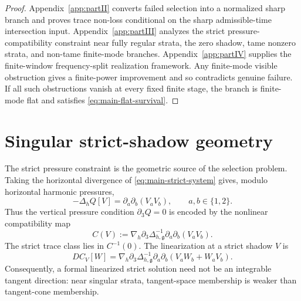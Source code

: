 \documentclass[11pt]{article}
\numberwithin{equation}{section}
\theoremstyle{plain}
\theoremstyle{definition}
\theoremstyle{remark}
\begin{document}
\begin{proof}
Appendix~\ref{app:partII} converts failed selection into a normalized sharp branch and proves trace non-loss conditional on the sharp admissible-time intersection input.  Appendix~\ref{app:partIII} analyzes the strict pressure-compatibility constraint near fully regular strata, the zero shadow, tame nonzero strata, and non-tame finite-mode branches.  Appendix~\ref{app:partIV} supplies the finite-window frequency-split realization framework.  Any finite-mode visible obstruction gives a finite-power improvement and so contradicts genuine failure.  If all such obstructions vanish at every fixed finite stage, the branch is finite-mode flat and satisfies \eqref{eq:main-flat-survival}.
\end{proof}

\section{Singular strict-shadow geometry}\label{sec:main-geometry}

The strict pressure constraint is the geometric source of the selection problem.  Taking the horizontal divergence of \eqref{eq:main-strict-system} gives, modulo horizontal harmonic pressures,
\[
        -\Delta_h Q[V]=\partial_a\partial_b(V_aV_b),
        \qquad a,b\in\{1,2\}.
\]
Thus the vertical pressure condition \(\partial_3Q=0\) is encoded by the nonlinear compatibility map
\begin{equation}\label{eq:main-compatibility-map}
        C(V):=\nabla_h\partial_3\Delta_{h,\mathfrak g}^{-1}\partial_a\partial_b(V_aV_b).
\end{equation}
The strict trace class lies in \(C^{-1}(0)\).  The linearization at a strict shadow \(V\) is
\[
        DC_V[W]=\nabla_h\partial_3\Delta_{h,\mathfrak g}^{-1}\partial_a\partial_b(V_aW_b+W_aV_b).
\]
Consequently, a formal linearized strict solution need not be an integrable tangent direction: near singular strata, tangent-space membership is weaker than tangent-cone membership.
\end{document}
